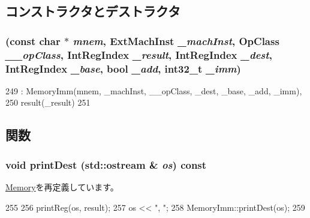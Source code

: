 \subsection{コンストラクタとデストラクタ}
\hypertarget{classArmISA_1_1MemoryExImm_a1d60bca042fa925db60bbda138d6a60a}{
\subsubsection[{MemoryExImm}]{ (const char $\ast$ {\em mnem}, \/  {\bf ExtMachInst} {\em \_\-machInst}, \/  OpClass {\em \_\-\_\-opClass}, \/  {\bf IntRegIndex} {\em \_\-result}, \/  {\bf IntRegIndex} {\em \_\-dest}, \/  {\bf IntRegIndex} {\em \_\-base}, \/  bool {\em \_\-add}, \/  int32\_\-t {\em \_\-imm})}}
\label{classArmISA_1_1MemoryExImm_a1d60bca042fa925db60bbda138d6a60a}



\begin{DoxyCode}
249         : MemoryImm(mnem, _machInst, __opClass, _dest, _base, _add, _imm),
250                     result(_result)
251     {}
\end{DoxyCode}


\subsection{関数}
\hypertarget{classArmISA_1_1MemoryExImm_adee5df6e5d6b0c498363aabda42431fa}{
\subsubsection[{printDest}]{\setlength{\rightskip}{0pt plus 5cm}void printDest (std::ostream \& {\em os}) const}}
\label{classArmISA_1_1MemoryExImm_adee5df6e5d6b0c498363aabda42431fa}


\hyperlink{classArmISA_1_1Memory_a9a9365f7ef96d4838529320970308a57}{Memory}を再定義しています。


\begin{DoxyCode}
255     {
256         printReg(os, result);
257         os << ", ";
258         MemoryImm::printDest(os);
259     }
\end{DoxyCode}


